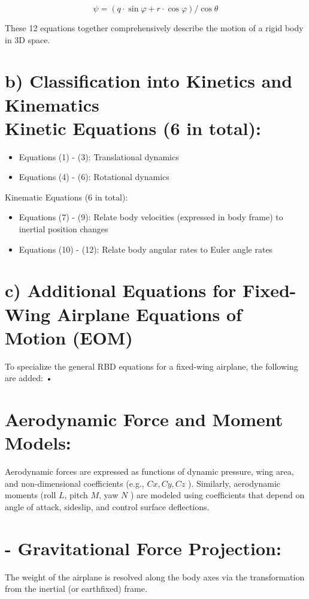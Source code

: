 \documentclass[10pt]{article}
\begin{document}
$$
\psi=(q \cdot \sin \varphi+r \cdot \cos \varphi) / \cos \theta
$$

These 12 equations together comprehensively describe the motion of a rigid body in 3D space.

\section*{b) Classification into Kinetics and Kinematics \\
 Kinetic Equations (6 in total):}
\begin{itemize}
  \item Equations (1) - (3): Translational dynamics
  \item Equations (4) - (6): Rotational dynamics
\end{itemize}

Kinematic Equations (6 in total):

\begin{itemize}
  \item Equations (7) - (9): Relate body velocities (expressed in body frame) to inertial position changes
  \item Equations (10) - (12): Relate body angular rates to Euler angle rates
\end{itemize}

\section*{c) Additional Equations for Fixed-Wing Airplane Equations of Motion (EOM)}
To specialize the general RBD equations for a fixed-wing airplane, the following are added: •

\section*{Aerodynamic Force and Moment Models:}
Aerodynamic forces are expressed as functions of dynamic pressure, wing area, and non-dimensional coefficients (e.g., $C x, C y, C z$ ). Similarly, aerodynamic moments (roll $L$, pitch $M$, yaw $N$ ) are modeled using coefficients that depend on angle of attack, sideslip, and control surface deflections.

\section*{- Gravitational Force Projection:}
The weight of the airplane is resolved along the body axes via the transformation from the inertial (or earthfixed) frame.
\end{document}
